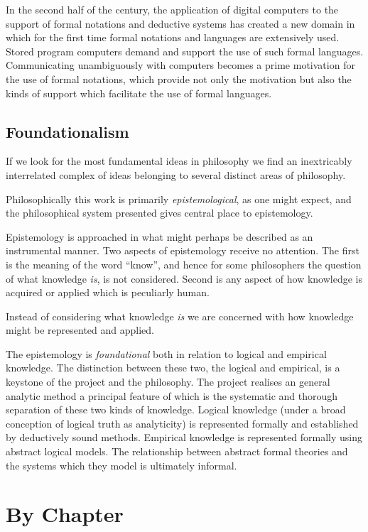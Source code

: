In the second half of the century, the application of digital
computers to the support of formal notations and deductive systems has
created a new domain in which for the first time formal notations and
languages are extensively used.
Stored program computers demand and support the use of such formal
languages.
Communicating unambiguously with computers becomes a prime motivation
for the use of formal notations, which provide not only the motivation
but also the kinds of support which facilitate the use of formal languages.

\subsection{Foundationalism}

If we look for the most fundamental ideas in philosophy we find an
inextricably interrelated complex of ideas belonging to several
distinct areas of philosophy.

Philosophically this work is primarily {\it epistemological}, as one
might expect, and the philosophical system presented gives central
place to epistemology. 

Epistemology is approached in what might perhaps be described as an
instrumental manner.
Two aspects of epistemology receive no attention.
The first is the meaning of the word ``know'', and hence for some
philosophers the question of what knowledge {\it is}, is not
considered.
Second is any aspect of how knowledge is acquired or applied which is
peculiarly human.

Instead of considering what knowledge {\it is} we are concerned with
how knowledge might be represented and applied.

The epistemology is {\it foundational} both in relation to logical
and empirical knowledge.
The distinction between these two, the logical and empirical, is a
keystone of the project and the philosophy.
The project realises an general analytic method a principal feature of
which is the systematic and thorough separation of these two kinds of
knowledge.
Logical knowledge (under a broad conception of logical truth as
analyticity) is represented formally and established by deductively
sound methods.
Empirical knowledge is represented formally using abstract logical
models.
The relationship between abstract formal theories and the systems
which they model is ultimately informal.

\section{By Chapter}

